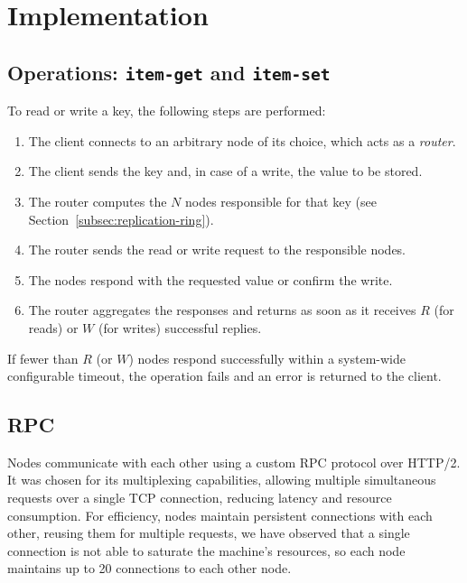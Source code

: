 \section{Implementation}
\label{sec:implementation}

\subsection{Operations: \texttt{item-get} and \texttt{item-set}}
\label{subsec:get-set}

To read or write a key, the following steps are performed:
\begin{enumerate}
    \item The client connects to an arbitrary node of its choice, which acts as
    a \emph{router}.
    \item The client sends the key and, in case of a write, the value to be
    stored.
    \item The router computes the $N$ nodes responsible for that key
    (see Section~\ref{subsec:replication-ring}).
    \item The router sends the read or write request to the responsible nodes.
    \item The nodes respond with the requested value or confirm the write.
    \item The router aggregates the responses and returns as soon as it
    receives $R$ (for reads) or $W$ (for writes) successful
    replies.
\end{enumerate}

If fewer than $R$ (or $W$) nodes respond successfully within a system-wide
configurable timeout, the operation fails and an error is returned to the
client.





\subsection{RPC}
\label{subsec:rpc}

Nodes communicate with each other using a custom RPC protocol over HTTP/2.
It was chosen for its multiplexing capabilities, allowing multiple simultaneous
requests over a single TCP connection, reducing latency and resource
consumption.
For efficiency, nodes maintain persistent connections with each other, reusing
them for multiple requests, we have observed that a single connection is not
able to saturate the machine's resources, so each node maintains up to 20
connections to each other node.

